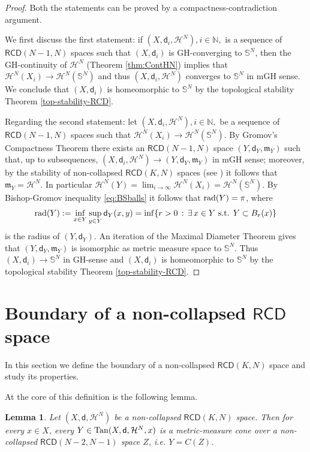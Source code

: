 \documentclass[a4paper]{amsart}
\theoremstyle{plain}
\newtheorem{lemma}{Lemma}[section]
\theoremstyle{definition}
\numberwithin{equation}{section}
\newcommand{\bS}{\mathbb{S}}
\newcommand{\N}{\mathbb{N}}
\newcommand{\RCD}{\mathsf{RCD}}
\newcommand{\mm}{\mathfrak m}
\newcommand{\sfd}{\mathsf d}
\newcommand{\cH}{\mathcal{H}}
\begin{document}
{{

\begin{proof} 
Both the statements can be proved by a compactness-contradiction argument.

We first discuss the first statement: if $(X,\sfd_{i}, \cH^{N}), i\in \N,$ is a sequence of $\RCD(N-1,N)$ spaces such that $(X,\sfd_{i})$ is GH-converging to $\bS^{N}$, then  the GH-continuity of $\cH^{N}$ (Theorem \ref{thm:ContHN}) implies that  $\cH^{N}(X_{i})\to  \cH^{N}(\bS^{N})$ and thus  $(X,\sfd_{i}, \cH^{N})$ converges to $\bS^{N}$ in mGH sense.  We conclude that $(X,\sfd_{i})$ is homeomorphic to $\bS^{N}$ by the topological stability Theorem \ref{top-stability-RCD}.

Regarding the second statement:  let $(X,\sfd_{i}, \cH^{N}), i\in \N,$ be a sequence of $\RCD(N-1,N)$ spaces such that $\cH^{N}(X_{i})\to  \cH^{N}(\bS^{N})$. By Gromov's Compactness Theorem there exists an $\RCD(N-1,N)$ space $(Y,\sfd_{Y}, \mm_{Y})$ such that, up to subsequences,  $(X,\sfd_{i}, \cH^{N})\to (Y,\sfd_{Y}, \mm_{Y})$ in mGH sense; moreover, by the stability of non-collapsed $\RCD(K,N)$ spaces (see \cite[Theorem 1.2]{GDPNonColl}) it follows that $\mm_{Y}=\cH^{N}$. In particular $\cH^{N}(Y)=\lim_{i\to \infty}  \cH^{N}(X_{i})=  \cH^{N}(\bS^{N})$. By Bishop-Gromov inequality \eqref{eq:BSballs} it follows that ${\rm rad}(Y)=\pi$, where
$$
{\rm rad}(Y):= \inf_{x\in Y} \sup_{y\in Y} \sfd_{Y}(x,y)=\inf\{r>0 \, :\,  \exists\, x\in Y \text{ s.t. } Y\subset B_{r}(x)\} 
$$
is the radius of $(Y,\sfd_{Y})$. An iteration of the Maximal Diameter Theorem \cite{Ket} gives that  $(Y,\sfd_{Y}, \mm_{Y})$ is isomorphic as metric measure space to $\bS^{N}$. Thus $(X,\sfd_{i})\to \bS^{N}$ in GH-sense and $(X,\sfd_{i})$ is homeomorphic to $\bS^{N}$ by the topological stability Theorem \ref{top-stability-RCD}.
\end{proof}
}


\section{Boundary of a non-collapsed $\RCD$ space}  
In this section we define the boundary of a non-collapsed  $\RCD(K,N)$ space and study its properties. 

At the core of this definition is the following lemma.


\begin{lemma}\label{lem:TanncRCD}
Let $(X,\sfd,\cH^{N})$ be a non-collapsed $\RCD(K,N)$ space. Then for every $x\in X$,  every  $Y\in {\rm Tan}(X,\sfd, \cH^{N}, x)$ is a metric-measure cone over a non-collapsed $\RCD(N-2,N-1)$ space $Z$, i.e. $Y=C(Z)$.
\end{lemma}

}
\end{document}
